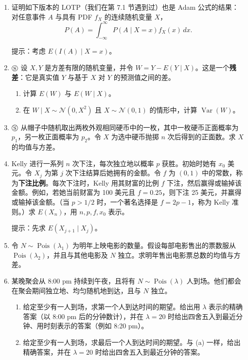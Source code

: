 \documentclass[UTF8,12pt,a4paper,fontset=fandol]{ctexart}
\begin{document}
\begin{enumerate}
\begin{enumerate}
    \noindent 提示：令 $X=YI_A$，然后写出 $X$ 的 PMF。

    \item[(c)] 用 (b) 简短证明
    \[
      E(Y)=E(Y\mid A)P(A)+E(Y\mid A^c)P(A^c).
    \]
  \end{enumerate}

  \item 证明如下版本的 LOTP（我们在第 7.1 节遇到过）也是 Adam 公式的结果：对任意事件 $A$ 与具有 PDF $f_X$ 的连续随机变量 $X$，
  \[
    P(A)=\int_{-\infty}^{\infty}P(A\mid X=x)f_X(x)\,dx.
  \]

  \noindent 提示：考虑 $E(I(A)\mid X=x)$。

  \item $\circledS$ 设 $X,Y$ 是方差有限的随机变量，并令 $W=Y-E(Y\mid X)$。这是一个\textbf{残差}：它是真实值 $Y$ 与基于 $X$ 对 $Y$ 的预测值之间的差。
  \begin{enumerate}
    \item[(a)] 计算 $E(W)$ 与 $E(W\mid X)$。
    \item[(b)] 在 $W\mid X\sim\mathcal N(0,X^2)$ 且 $X\sim\mathcal N(0,1)$ 的情形中，计算 $\operatorname{Var}(W)$。
  \end{enumerate}

  \item $\circledS$ 从帽子中随机取出两枚外观相同硬币中的一枚，其中一枚硬币正面概率为 $p_1$，另一枚正面概率为 $p_2$。令 $X$ 为选中硬币抛掷 $n$ 次后得到的正面数。求 $X$ 的均值与方差。

  \item Kelly 进行一系列 $n$ 次下注，每次独立地以概率 $p$ 获胜。初始时她有 $x_0$ 美元。令 $X_j$ 为第 $j$ 次下注结算后她拥有的金额。令 $f$ 为 $(0,1)$ 中的常数，称为\textbf{下注比例}。每次下注时，Kelly 用其财富的比例 $f$ 下注，然后赢得或输掉该金额。例如，若她当前财富为 100 美元且 $f=0.25$，则下注 25 美元，并赢得或输掉该金额。（当 $p>1/2$ 时，一个著名选择是 $f=2p-1$，称为 Kelly 准则。）求 $E(X_n)$，用 $n,p,f,x_0$ 表示。

  \noindent 提示：先求 $E(X_{j+1}\mid X_j)$。

  \item 令 $N\sim\operatorname{Pois}(\lambda_1)$ 为明年上映电影的数量。假设每部电影售出的票数服从 $\operatorname{Pois}(\lambda_2)$，并且与其他电影及 $N$ 独立。求明年售出电影票总数的均值与方差。

  \item 某晚聚会从 8:00 pm 持续到午夜，且将有 $N\sim\operatorname{Pois}(\lambda)$ 人到场。他们都会在聚会期间独立地、均匀随机地到达，且与 $N$ 独立。
  \begin{enumerate}
    \item[(a)] 给定至少有一人到场，求第一个人到达时间的期望。给出用 $\lambda$ 表示的精确答案（以 8:00 pm 后的分钟数计），并在 $\lambda=20$ 时给出四舍五入到最近分钟、用时刻表示的答案（例如 8:20 pm）。
    \item[(b)] 给定至少有一人到场，求最后一个人到达时间的期望。与 (a) 一样，给出精确答案，并在 $\lambda=20$ 时给出四舍五入到最近分钟的答案。
  \end{enumerate}


\end{enumerate}
\end{document}
